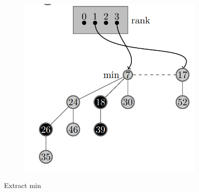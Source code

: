 \documentclass[14pt,a4paper]{report}
\begin{document}
\begin{figure}[H]
\begin{subfigure}[H]{0.4\textwidth}
         \centering
         \includegraphics[width=\textwidth]{e7.png}
         \caption{}
         \label{fig:e7}
     \end{subfigure}
    \caption{Extract min}
    \label{fig:e}
\end{figure}



 


\end{document}
